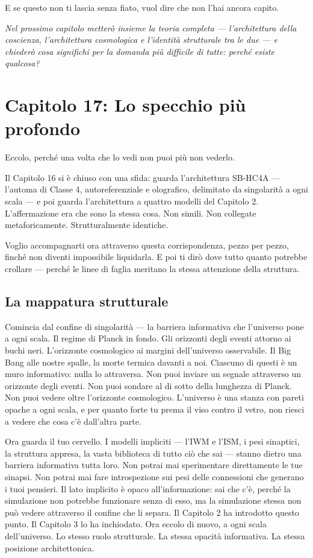 \documentclass[11pt, twoside, openright]{book}
\begin{document}
E se questo non ti lascia senza fiato, vuol dire che non l'hai ancora capito.


\textit{Nel prossimo capitolo metterò insieme la teoria completa --- l'architettura della coscienza, l'architettura cosmologica e l'identità strutturale tra le due --- e chiederò cosa significhi per la domanda più difficile di tutte: perché esiste qualcosa?}


\chapter*{Capitolo 17: Lo specchio più profondo}

Eccolo, perché una volta che lo vedi non puoi più non vederlo.

Il Capitolo 16 si è chiuso con una sfida: guarda l'architettura SB-HC4A --- l'automa di Classe 4, autoreferenziale e olografico, delimitato da singolarità a ogni scala --- e poi guarda l'architettura a quattro modelli del Capitolo 2. L'affermazione era che sono la stessa cosa. Non simili. Non collegate metaforicamente. Strutturalmente identiche.

Voglio accompagnarti ora attraverso questa corrispondenza, pezzo per pezzo, finché non diventi impossibile liquidarla. E poi ti dirò dove tutto quanto potrebbe crollare --- perché le linee di faglia meritano la stessa attenzione della struttura.

\section*{La mappatura strutturale}

Comincia dal confine di singolarità --- la barriera informativa che l'universo pone a ogni scala. Il regime di Planck in fondo. Gli orizzonti degli eventi attorno ai buchi neri. L'orizzonte cosmologico ai margini dell'universo osservabile. Il Big Bang alle nostre spalle, la morte termica davanti a noi. Ciascuno di questi è un muro informativo: nulla lo attraversa. Non puoi inviare un segnale attraverso un orizzonte degli eventi. Non puoi sondare al di sotto della lunghezza di Planck. Non puoi vedere oltre l'orizzonte cosmologico. L'universo è una stanza con pareti opache a ogni scala, e per quanto forte tu prema il viso contro il vetro, non riesci a vedere che cosa c'è dall'altra parte.

Ora guarda il tuo cervello. I modelli impliciti --- l'IWM e l'ISM, i pesi sinaptici, la struttura appresa, la vasta biblioteca di tutto ciò che sai --- stanno dietro una barriera informativa tutta loro. Non potrai mai sperimentare direttamente le tue sinapsi. Non potrai mai fare introspezione sui pesi delle connessioni che generano i tuoi pensieri. Il lato implicito è opaco all'informazione: sai che c'è, perché la simulazione non potrebbe funzionare senza di esso, ma la simulazione stessa non può vedere attraverso il confine che li separa. Il Capitolo 2 ha introdotto questo punto. Il Capitolo 3 lo ha inchiodato. Ora eccolo di nuovo, a ogni scala dell'universo. Lo stesso ruolo strutturale. La stessa opacità informativa. La stessa posizione architettonica.
\end{document}

